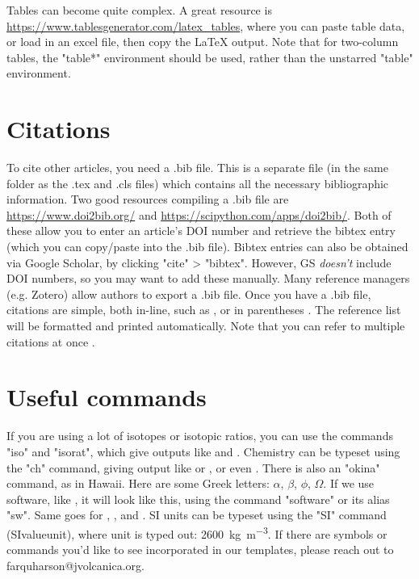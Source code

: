 \documentclass[draft, english]{volcanica-template}
\begin{document}
Tables can become quite complex. A great resource is \url{https://www.tablesgenerator.com/latex_tables}, where you can paste table data, or load in an excel file, then copy the LaTeX output. Note that for two-column tables, the "table*" environment should be used, rather than the unstarred "table" environment.

\section{Citations}
To cite other articles, you need a .bib file. This is a separate file (in the same folder as the .tex and .cls files) which contains all the necessary bibliographic information. Two good resources compiling a .bib file are \url{https://www.doi2bib.org/} and \url{https://scipython.com/apps/doi2bib/}. Both of these allow you to enter an article's DOI number and retrieve the bibtex entry (which you can copy/paste into the .bib file). Bibtex entries can also be obtained via Google Scholar, by clicking "cite" > "bibtex". However, GS \emph{doesn't} include DOI numbers, so you may want to add these manually. Many reference managers (e.g. Zotero) allow authors to export a .bib file. Once you have a .bib file, citations are simple, both in-line, such as \textcite{Farquharson2018}, or in parentheses \parencite{Kavanagh2022}. The reference list will be formatted and printed automatically. Note that you can refer to multiple citations at once \parencite[e.g.][among others]{Kavanagh2022, Siebert2015}.

\section{Useful commands}

If you are using a lot of isotopes or isotopic ratios, you can use the commands "iso" and "isorat", which give outputs like  and . Chemistry can be typeset using the "ch" command, giving output like  or \ch{[AgCl2]-}, or even . There is also an "okina" command, as in Hawai{\okina}i. Here are some Greek letters: $\alpha$, $\beta$, $\phi$, $\Omega$. If we use software, like , it will look like this, using the command "software" or its alias "sw". Same goes for , , and . SI units can be typeset using the "SI" command (SI{value}{unit}), where  unit is typed out: \SI{2600}{\kilo\gram\per\meter\cubed}. If there are symbols or commands you'd like to see incorporated in our templates, please reach out to farquharson@jvolcanica.org.
\end{document}
